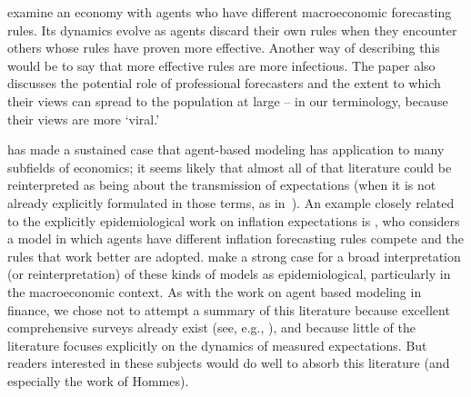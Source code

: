 
\cite{arifovic2018learning} examine an economy with agents who have different macroeconomic forecasting rules.  Its dynamics evolve as agents discard their own rules when they encounter others whose rules have proven more effective.  Another way of describing this would be to say that more effective rules are more infectious.    The paper also discusses the potential role of professional forecasters and the extent to which their views can spread to the population at large -- in our terminology, because their views are more `viral.'

\cite{tesfatsion2006agent} has made a sustained case that agent-based modeling has application to many subfields of economics; it seems likely that almost all of that literature could be reinterpreted as being about the transmission of expectations (when it is not already explicitly formulated in those terms, as in~\cite{hommes2006heterogeneous}).  An example closely related to the explicitly epidemiological work on inflation expectations is \cite{branchHeteroExp}, who considers a model in which agents have different inflation forecasting rules compete and the rules that work better are adopted.  \cite{haldane_drawing_2019} make a strong case for a broad interpretation (or reinterpretation) of these kinds of models as epidemiological, particularly in the macroeconomic context.  As with the work on agent based modeling in finance, we chose not to attempt a summary of this literature because excellent comprehensive surveys already exist (see, e.g., \cite{ddAgentBasedMacro}), and because little of the literature focuses explicitly on the dynamics of measured expectations.  But readers interested in these subjects would do well to absorb this literature (and especially the work of Hommes).

